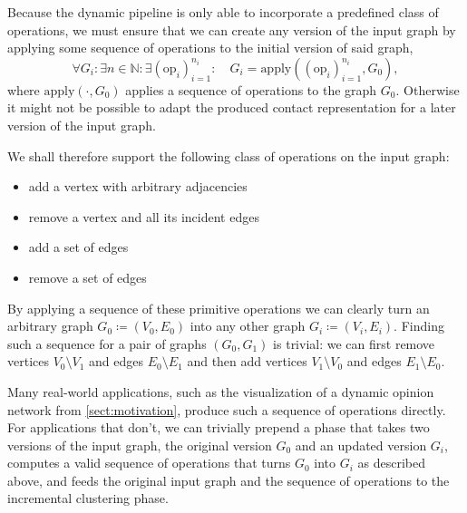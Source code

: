 Because the dynamic pipeline is only able to incorporate a predefined class of operations, we must ensure that we can create any version of the input graph by applying some sequence of operations to the initial version of said graph, \ie{}
%
\begin{equation*}
	\forall G_i \colon \exists n \in \mathbb{N} \colon \exists (\text{op}_i)_{i=1}^{n_i} \colon \quad G_i = \text{apply}((\text{op}_i)_{i=1}^{n_i}, G_0),
\end{equation*}
%
where $\text{apply}(\cdot, G_0)$ applies a sequence of operations to the graph $G_0$. Otherwise it might not be possible to adapt the produced contact representation for a later version of the input graph.

We shall therefore support the following class of operations on the input graph:
%
\begin{itemize}
	\setlength\itemsep{-0.5em}
	\item add a vertex with arbitrary adjacencies
	\item remove a vertex and all its incident edges
	\item add a set of edges
	\item remove a set of edges
\end{itemize}
%
By applying a sequence of these primitive operations we can clearly turn an arbitrary graph $G_0 \coloneqq (V_0, E_0)$ into any other graph $G_i \coloneqq (V_i, E_i)$. Finding such a sequence for a pair of graphs $(G_0, G_1)$ is trivial: we can first remove vertices $V_0 \setminus V_1$ and edges $E_0 \setminus E_1$ and then add vertices $V_1 \setminus V_0$ and edges $E_1 \setminus E_0$.

Many real-world applications, such as the visualization of a dynamic opinion network from \cref{sect:motivation}, produce such a sequence of operations directly. For applications that don't, we can trivially prepend a phase that takes two versions of the input graph, the original version $G_0$ and an updated version $G_i$, computes a valid sequence of operations that turns $G_0$ into $G_i$ as described above, and feeds the original input graph and the sequence of operations to the incremental clustering phase.

\clearpage

\clearpage

\clearpage


